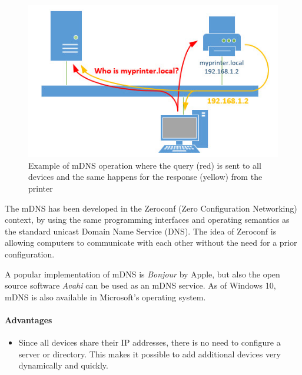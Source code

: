 \documentclass[fleqn, 11pt]{SelfArx} %
\begin{document}
\begin{figure}[H]\centering
    \includegraphics[width=\linewidth]{./mdns-02.jpg}
    \caption{Example of mDNS operation where the query (red) is sent to all devices and the same happens for the response (yellow) from the printer}
    \label{fig:msdns-1}
\end{figure}

The mDNS has been developed in the Zeroconf (Zero Configuration Networking) context, by using the same programming interfaces and operating semantics as the standard unicast Domain Name Service (DNS). 
The idea of Zeroconf is allowing computers to communicate with each other without the need for a prior configuration.\newline

A popular implementation of mDNS is \textit{Bonjour} by Apple, but also the open source software \textit{Avahi} can be used as an mDNS service. As of Windows 10, mDNS is also available in Microsoft's operating system.

\paragraph{Advantages} 
\begin{itemize}[leftmargin=*]
    \item Since all devices share their IP addresses, there is no need to configure a server or directory. This makes it possible to add additional devices very dynamically and quickly.
\end{itemize}
\end{document}
